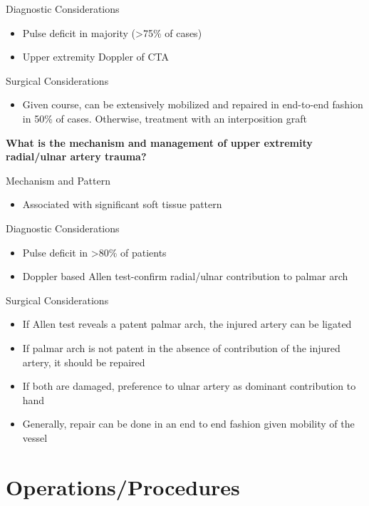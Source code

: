 \documentclass[
]{book}
\providecommand{\tightlist}{%
  \setlength{\itemsep}{0pt}\setlength{\parskip}{0pt}}
\begin{document}
Diagnostic Considerations

\begin{itemize}
\item
  Pulse deficit in majority (\textgreater75\% of cases)
\item
  Upper extremity Doppler of CTA
\end{itemize}

Surgical Considerations~

\begin{itemize}
\tightlist
\item
  Given course, can be extensively mobilized and repaired in
  end-to-end fashion in 50\% of cases. Otherwise, treatment with an
  interposition graft
\end{itemize}

\textbf{What is the mechanism and management of upper extremity radial/ulnar
artery trauma?}

Mechanism and Pattern

\begin{itemize}
\tightlist
\item
  Associated with significant soft tissue pattern
\end{itemize}

Diagnostic Considerations

\begin{itemize}
\item
  Pulse deficit in \textgreater80\% of patients~
\item
  Doppler based Allen test-confirm radial/ulnar contribution to palmar
  arch
\end{itemize}

Surgical Considerations~

\begin{itemize}
\item
  If Allen test reveals a patent palmar arch, the injured artery can
  be ligated~
\item
  If palmar arch is not patent in the absence of contribution of the
  injured artery, it should be repaired
\item
  If both are damaged, preference to ulnar artery as dominant
  contribution to hand~
\item
  Generally, repair can be done in an end to end fashion given
  mobility of the vessel
\end{itemize}

\hypertarget{operationsprocedures}{%
\section{Operations/Procedures}\label{operationsprocedures}}
\end{document}
